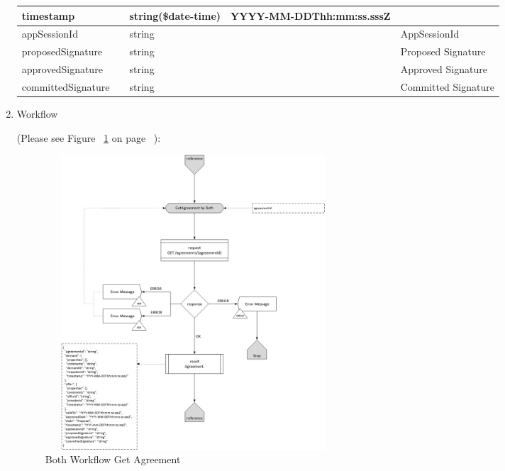 \begin{enumerate}
\begin{table}[H]
\begin{center}
\begin{tabular}{|p{3cm}|l|p{3cm}|p{3cm}|p{4cm}|}
timestamp		& 	& 	string(\$date-time)	&	YYYY-MM-DDThh:mm:ss.sssZ	&	 \\ 
\hline

appSessionId	&	&	string 				&			&	AppSessionId \\
\hline

proposedSignature &		& string 			&			&	Proposed Signature \\
\hline

approvedSignature &		&  string			&			&  Approved Signature \\
\hline  
  
committedSignature &	& 	string			&			&	Committed Signature \\
\hline

\end{tabular}
\end{center}

\end{table}

\item Workflow

(Please see Figure ~\ref{fig:BGA} on page ~\pageref{fig:BGA}):

\begin{figure}[H]
    \centering
    \includegraphics[width=11cm,height=11cm,angle=0]{./diag/Workflow/Market/GetAgreement-B-Workflow.png}
    \caption{Both Workflow Get Agreement }
	\label{fig:BGA}
\end{figure}

\end{enumerate}

